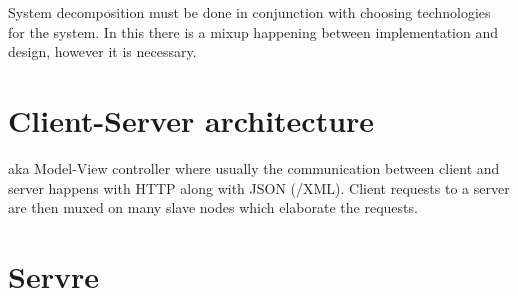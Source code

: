 System decomposition must be done in conjunction with choosing technologies for the system.
In this there is a mixup happening between implementation and design, however it is necessary.

\section{Client-Server architecture}
aka Model-View controller where usually the communication between client and server happens with HTTP along with JSON (/XML).
Client requests to a server are then muxed on many slave nodes which elaborate the requests.


\section{Servre}